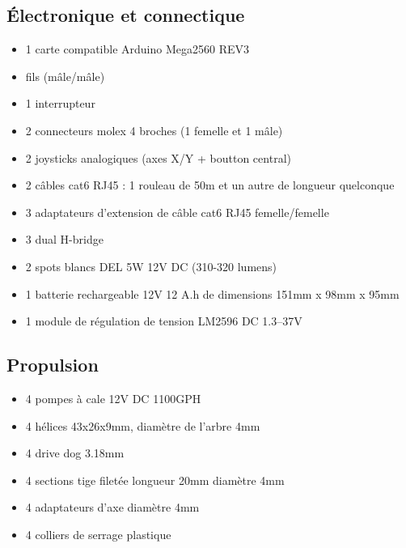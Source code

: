 \documentclass[11pt,a4paper]{article}
\begin{document}
    \subsection{Électronique et connectique}
      \begin{itemize}
        \setlength\itemsep{-2mm}
        \item 1 carte compatible Arduino Mega2560 REV3 \cite{arduino}
        \item fils (mâle/mâle)
        \item 1 interrupteur
        \item 2 connecteurs molex 4 broches (1 femelle et 1 mâle)
        \item 2 joysticks analogiques (axes X/Y + boutton central) \cite{joystick}
        \item 2 câbles cat6 RJ45 : 1 rouleau de 50m et un autre de longueur quelconque
        \item 3 adaptateurs d'extension de câble cat6 RJ45 femelle/femelle
        \item 3 dual H-bridge %
        \item 2 spots blancs DEL 5W 12V DC (310-320 lumens) \cite{lampe}
        \item 1 batterie rechargeable 12V 12 A.h de dimensions 151mm x 98mm x 95mm
        \item 1 module de régulation de tension LM2596 DC 1.3--37V \cite{regulateurTension}%
      \end{itemize}

    \subsection{Propulsion}
      \begin{itemize}
        \setlength\itemsep{-2mm}
        \item 4 pompes à cale 12V DC 1100GPH \cite{pompe}
        \item 4 hélices 43x26x9mm, diamètre de l'arbre 4mm \cite{helice}
        \item 4 drive dog 3.18mm \cite{driveDog}
        \item 4 sections tige filetée longueur 20mm diamètre 4mm %
        \item 4 adaptateurs d'axe diamètre 4mm \cite{adaptateurAxe}
        \item 4 colliers de serrage plastique
      \end{itemize}
      
\end{document}
